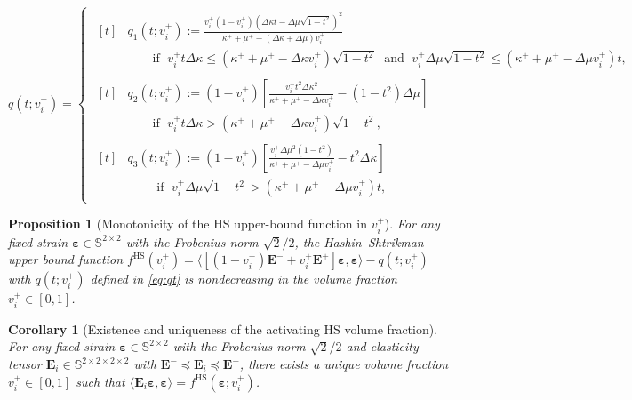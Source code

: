 \documentclass[10pt,a4paper]{amsart}
\newtheorem{proposition}{Proposition}
\newtheorem{corollary}{Corollary}
\newcommand{\Ei}{\tensf{E}_i}                       %
\newcommand{\Emax}{\tensf{E}^{+}}                   %
\newcommand{\Emin}{\tensf{E}^{-}}                   %
\newcommand{\strain}{\tenss{\varepsilon}}           %
\newcommand{\tensf}[1]{\bm{\mathbf{#1}}}            %
\newcommand{\tenss}[1]{\bm{\mathbf{#1}}}            %
\begin{document}
\begin{equation}\label{eq:qt}
q(t;v_i^+) =
\begin{cases}
    \begin{aligned}[t]
        &q_1(t;v_i^+) := 
        \frac{v_i^{+}(1-v_i^{+}) \left(\Delta\kappa t - \Delta\mu \sqrt{1-t^2} \right)^{2}}{\kappa^+ + \mu^+ -(\Delta \kappa + \Delta \mu)v_i^+}\\
        &\qquad\text{if }\; v_i^{+}t \Delta \kappa \le (\kappa^+ + \mu^+ - \Delta \kappa v_i^+) \sqrt{1-t^2}
        \;\text{ and }\; v_i^{+} \Delta \mu \sqrt{1-t^2} \le (\kappa^+ + \mu^+ - \Delta \mu v_i^+) t,
    \end{aligned}\\
    \begin{aligned}[t]
        &q_2(t;v_i^+) :=  \left(1-{v_i^+}\right)\left[\frac{v_i^+ {t}^2 \Delta\kappa^2}{\kappa^+  + \mu^+ - \Delta \kappa v_i^+}-(1-t^2) \Delta \mu \right]\\
        &\qquad\text{if }\; v_i^{+}t \Delta \kappa > (\kappa^+ + \mu^+ - \Delta \kappa v_i^+) \sqrt{1-t^2},
    \end{aligned}\\
    \begin{aligned}[t]
        &q_3(t;v_i^+) :=
        \left(1-{v_i^+}\right)\left[\frac{{v_i^+} {\Delta \mu}^2 (1-t^2)}{\kappa^+ + \mu^+ - \Delta \mu v_i^+}-t^2 \Delta\kappa\right]\\
        &\qquad\text{ if }\; v_i^{+} \Delta \mu \sqrt{1-t^2} > (\kappa^{+} + \mu^{+} - \Delta \mu v_i^+) t,
    \end{aligned}
\end{cases}
\end{equation}

\begin{proposition}[Monotonicity of the HS upper-bound function in $v_i^+$]\label{prop:hs_monotone}
    For any fixed strain $\strain \in \mathbb{S}^{2\times2}$ with the Frobenius norm $\sqrt{2}/2$, the Hashin--Shtrikman upper bound function $f^{\mathrm{HS}} (v_i^+)=\langle [(1-v_i^+)\Emin + v_i^+ \Emax ]\strain,\strain \rangle - q(t;v_i^+)$ with $q(t;v_i^+)$ defined in \eqref{eq:qt} is nondecreasing in the volume fraction $v_i^+ \in [0,1]$.
\end{proposition}

\begin{corollary}[Existence and uniqueness of the activating HS volume fraction]\label{cor:uniqueness}
    For any fixed strain $\strain \in \mathbb{S}^{2\times2}$ with the Frobenius norm $\sqrt{2}/2$ and elasticity tensor $\Ei \in \mathbb{S}^{2\times2\times2\times2}$ with $\Emin \preceq \Ei \preceq \Emax$, there exists a unique volume fraction $v_i^+ \in [0,1]$ such that $\langle \Ei \strain, \strain\rangle = f^{\mathrm{HS}}(\strain;v_i^+)$.
\end{corollary}
\end{document}
